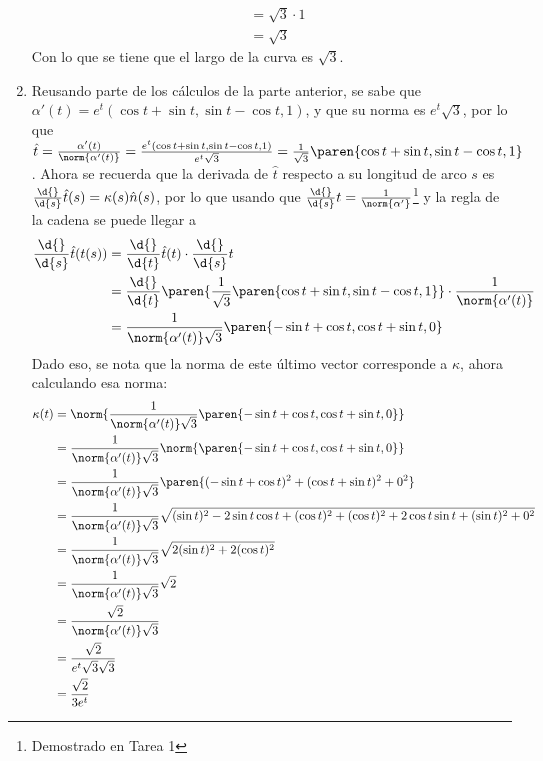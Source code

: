 \documentclass{homework}
\begin{document}
\begin{sol}
\begin{enumerate}
\begin{align*}
            &=\sqrt{3}\cdot1\\
            &=\sqrt{3}
        \end{align*}
        Con lo que se tiene que el largo de la curva es \(\sqrt{3}\).
        \item Reusando parte de los cálculos de la parte anterior, se sabe que \(\alpha'(t)=e^t(\cos t+\sin t,\sin t-\cos t, 1)\), y que su norma es \(e^t\sqrt{3}\), por lo que \(\hat{t}=\frac{\alpha'(t)}{\norm{\alpha'(t)}}=\frac{e^t(\cos t+\sin t,\sin t-\cos t, 1)}{e^t\sqrt{3}}=\frac1{\sqrt{3}}\paren{\cos t+\sin t, \sin t-\cos t, 1}\). Ahora se recuerda que la derivada de \(\hat{t}\) respecto a su longitud de arco \(s\) es \(\frac{\d{}}{\d{s}}\hat{t}(s)=\kappa(s)\hat{n}(s)\), por lo que usando que \(\frac{\d{}}{\d{s}}t=\frac1{\norm{\alpha'}}\)\footnote{Demostrado en Tarea 1} y la regla de la cadena se puede llegar a
        \begin{align*}
            \frac{\d{}}{\d{s}}\hat{t}(t(s))&=\frac{\d{}}{\d{t}}\hat{t}(t)\cdot\frac{\d{}}{\d{s}}t\\
            &=\frac{\d{}}{\d{t}}\paren{\frac1{\sqrt{3}}\paren{\cos t+\sin t,\sin t-\cos t, 1}}\cdot\frac1{\norm{\alpha'(t)}}\\
            &=\frac1{\norm{\alpha'(t)}\sqrt{3}}\paren{-\sin t+\cos t,\cos t+\sin t, 0}
        \end{align*}
        Dado eso, se nota que la norma de este último vector corresponde a \(\kappa\), ahora calculando esa norma:
        \begin{align*}
            \kappa(t)&=\norm{\frac1{\norm{\alpha'(t)}\sqrt{3}}\paren{-\sin t+\cos t,\cos t+\sin t, 0}}\\
            &=\frac1{\norm{\alpha'(t)}\sqrt{3}}\norm{\paren{-\sin t+\cos t,\cos t+\sin t, 0}}\\
            &=\frac1{\norm{\alpha'(t)}\sqrt{3}}\paren{(-\sin t+\cos t)^2+(\cos t+\sin t)^2+0^2}\\
            &=\frac1{\norm{\alpha'(t)}\sqrt{3}}\sqrt{(\sin t)^2-2\sin t\cos t+(\cos t)^2+(\cos t)^2+2\cos t\sin t+(\sin t)^2+0^2}\\
            &=\frac1{\norm{\alpha'(t)}\sqrt{3}}\sqrt{2(\sin t)^2+2(\cos t)^2}\\
            &=\frac1{\norm{\alpha'(t)}\sqrt{3}}\sqrt{2}\\
            &=\frac{\sqrt{2}}{\norm{\alpha'(t)}\sqrt{3}}\\
            &=\frac{\sqrt{2}}{e^t\sqrt{3}\sqrt{3}}\\
            &=\frac{\sqrt{2}}{3e^t}\\

\end{align*}
\end{enumerate}
\end{sol}
\end{document}
